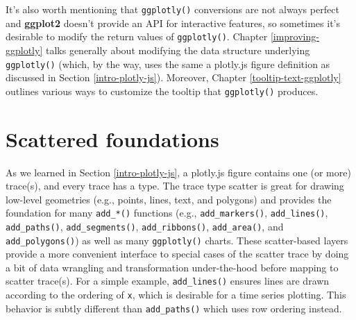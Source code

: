 \documentclass[
  12pt,
]{krantz}
\newenvironment{Shaded}{\begin{snugshade}}{\end{snugshade}}
\newcommand{\CommentTok}[1]{\textcolor[rgb]{0.56,0.35,0.01}{\textit{#1}}}
\newcommand{\DataTypeTok}[1]{\textcolor[rgb]{0.13,0.29,0.53}{#1}}
\newcommand{\KeywordTok}[1]{\textcolor[rgb]{0.13,0.29,0.53}{\textbf{#1}}}
\newcommand{\NormalTok}[1]{#1}
\newcommand{\OperatorTok}[1]{\textcolor[rgb]{0.81,0.36,0.00}{\textbf{#1}}}
\newcommand{\StringTok}[1]{\textcolor[rgb]{0.31,0.60,0.02}{#1}}
\begin{document}
It's also worth mentioning that \texttt{ggplotly()} conversions are not always perfect and \textbf{ggplot2} doesn't provide an API for interactive features, so sometimes it's desirable to modify the return values of \texttt{ggplotly()}. Chapter \ref{improving-ggplotly} talks generally about modifying the data structure underlying \texttt{ggplotly()} (which, by the way, uses the same a plotly.js figure definition as discussed in Section \ref{intro-plotly-js}). Moreover, Chapter \ref{tooltip-text-ggplotly} outlines various ways to customize the tooltip that \texttt{ggplotly()} produces.

\hypertarget{scatter-traces}{%
\chapter{Scattered foundations}\label{scatter-traces}}


As we learned in Section \ref{intro-plotly-js}, a plotly.js figure contains one (or more) trace(s), and every trace has a type. The trace type scatter is great for drawing low-level geometries (e.g., points, lines, text, and polygons) and provides the foundation for many \texttt{add\_*()} functions (e.g., \texttt{add\_markers()}, \texttt{add\_lines()}, \texttt{add\_paths()}, \texttt{add\_segments()}, \texttt{add\_ribbons()}, \texttt{add\_area()}, and \texttt{add\_polygons()}) as well as many \texttt{ggplotly()} charts. These scatter-based layers provide a more convenient interface to special cases of the scatter trace by doing a bit of data wrangling and transformation under-the-hood before mapping to scatter trace(s). For a simple example, \texttt{add\_lines()} ensures lines are drawn according to the ordering of \texttt{x}, which is desirable for a time series plotting. This behavior is subtly different than \texttt{add\_paths()} which uses row ordering instead.


\begin{Shaded}
\end{Shaded}
\end{document}

